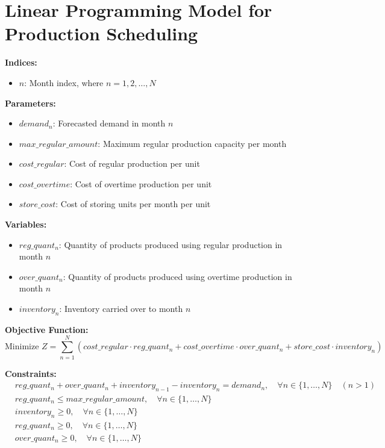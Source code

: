 \documentclass{article}
\begin{document}
\section*{Linear Programming Model for Production Scheduling}

\textbf{Indices:}
\begin{itemize}
    \item \( n \): Month index, where \( n = 1, 2, \ldots, N \)
\end{itemize}

\textbf{Parameters:}
\begin{itemize}
    \item \( demand_n \): Forecasted demand in month \( n \)
    \item \( max\_regular\_amount \): Maximum regular production capacity per month
    \item \( cost\_regular \): Cost of regular production per unit
    \item \( cost\_overtime \): Cost of overtime production per unit
    \item \( store\_cost \): Cost of storing units per month per unit
\end{itemize}

\textbf{Variables:}
\begin{itemize}
    \item \( reg\_quant_n \): Quantity of products produced using regular production in month \( n \)
    \item \( over\_quant_n \): Quantity of products produced using overtime production in month \( n \)
    \item \( inventory_n \): Inventory carried over to month \( n \)
\end{itemize}

\textbf{Objective Function:}
\[
\text{Minimize } Z = \sum_{n=1}^{N} \left( cost\_regular \cdot reg\_quant_n + cost\_overtime \cdot over\_quant_n + store\_cost \cdot inventory_n \right)
\]

\textbf{Constraints:}
\begin{align*}
    & reg\_quant_n + over\_quant_n + inventory_{n-1} - inventory_n = demand_n, \quad \forall n \in \{1, \ldots, N\} \quad (n > 1) \\
    & reg\_quant_n \leq max\_regular\_amount, \quad \forall n \in \{1, \ldots, N\} \\
    & inventory_n \geq 0, \quad \forall n \in \{1, \ldots, N\} \\
    & reg\_quant_n \geq 0, \quad \forall n \in \{1, \ldots, N\} \\
    & over\_quant_n \geq 0, \quad \forall n \in \{1, \ldots, N\}
\end{align*}
\end{document}
